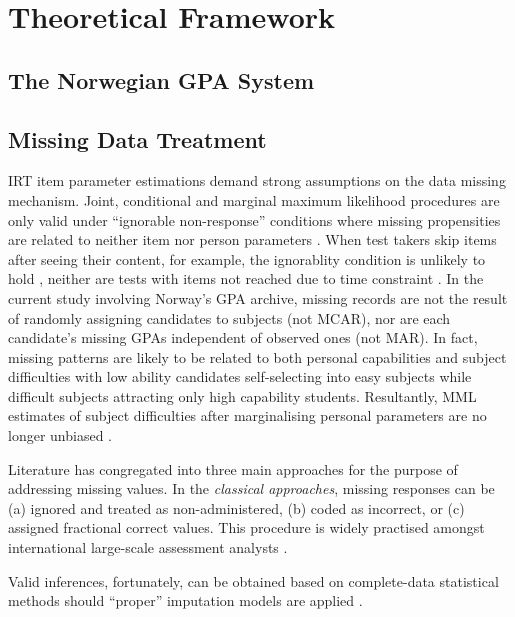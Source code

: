\section{Theoretical Framework}

\subsection{The Norwegian GPA System}

\subsection{Missing Data Treatment}

IRT item parameter estimations demand strong assumptions on the data missing mechanism. Joint, conditional and marginal maximum likelihood procedures are only valid under ``ignorable non-response'' conditions where missing propensities are related to neither item nor person parameters \parencite{molenaar:1995}. When test takers skip items after seeing their content, for example, the ignorablity condition is unlikely to hold \parencite{mislevy:1987}, neither are tests with items not reached due to time constraint \parencite{lord:1974, lord:1983}. In the current study involving Norway's GPA archive, missing records are not the result of randomly assigning candidates to subjects (not MCAR), nor are each candidate's missing GPAs independent of observed ones (not MAR). In fact, missing patterns are likely to be related to both personal capabilities and subject difficulties with low ability candidates self-selecting into easy subjects while difficult subjects attracting only high capability students. Resultantly, MML estimates of subject difficulties after marginalising personal parameters are no longer unbiased \parencite[][Table 2]{mislevy:1988}.

Literature has congregated into three main approaches for the purpose of addressing missing values. In the \emph{classical approaches}, missing responses can be (a) ignored and treated as non-administered, (b) coded as incorrect, or (c) assigned fractional correct values. This procedure is widely practised amongst international large-scale assessment analysts \parencite{pohl:2014}.

Valid inferences, fortunately, can be obtained based on complete-data statistical methods should ``proper'' imputation models are applied \parencite[][Chapter 4]{rubin:1987}.